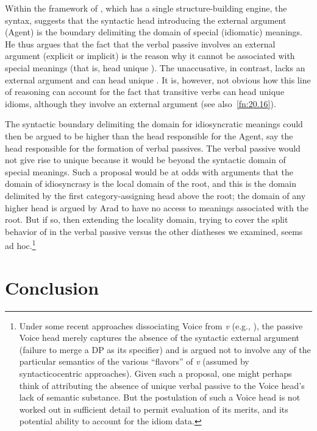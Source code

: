 \documentclass[output=paper]{langsci/langscibook}
\begin{document}
Within the framework of , which has a single
structure-building engine, the syntax, \citet{Marantz1997} suggests that the
syntactic head introducing the external argument (Agent) is the boundary
delimiting the domain of special (idiomatic) meanings. He thus argues that the
fact that the verbal passive involves an external argument (explicit or
implicit) is the reason why it cannot be associated with special meanings (that
is, head unique ). The unaccusative, in
contrast, lacks an external argument and can head unique . It is,
however, not obvious how this line of reasoning can account for the fact that
transitive verbs can head unique idioms, although they involve an external
argument (see also~\cref{fn:20.16}).\largerpage[2]

The syntactic boundary delimiting the domain for idiosyncratic meanings could
then be argued to be higher than the head responsible for the Agent, say the
head responsible for the formation of verbal passives. The verbal passive would
not give rise to unique  because it would be beyond the syntactic domain
of special meanings. Such a proposal would be at odds with 
arguments that the domain of idiosyncrasy is the local domain of the root, and
this is the domain delimited by the first category-assigning head above the
root; the domain of any higher head is argued by Arad to have no access to
meanings associated with the root. But if so, then extending the locality
domain, trying to cover the split behavior of  in the verbal
passive versus the other diatheses we examined, seems ad hoc.\footnote{Under
    some recent approaches dissociating Voice from \emph{v} (e.g.,
    \citealt{Harley2013}), the passive Voice head merely captures the absence
    of the syntactic external argument (failure to merge a DP as its specifier)
    and is argued not to involve any of the particular semantics of the various
    ``flavors'' of \emph{v} (assumed by syntacticocentric approaches). Given
    such a proposal, one might perhaps think of attributing the absence of
    unique verbal passive  to the Voice head’s lack of semantic
    substance. But the postulation of such a Voice head is not worked out in
    sufficient detail to permit evaluation of its merits, and its potential
ability to account for the idiom data. }

\section{Conclusion} %
\end{document}
